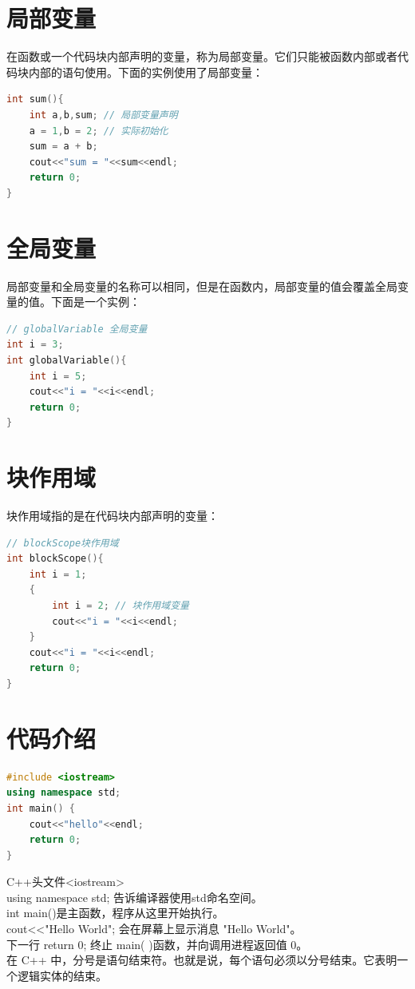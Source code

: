 \documentclass[12pt,twiside,a4paper]{ctexbook}
\numberwithin{chapter}{part}
\begin{document}
\section{局部变量}
在函数或一个代码块内部声明的变量，称为局部变量。它们只能被函数内部或者代码块内部的语句使用。下面的实例使用了局部变量：
\begin{lstlisting}[language=C++]
int sum(){
	int a,b,sum; // 局部变量声明
	a = 1,b = 2; // 实际初始化
	sum = a + b;
	cout<<"sum = "<<sum<<endl;
	return 0;
}
\end{lstlisting}

\section{全局变量}
局部变量和全局变量的名称可以相同，但是在函数内，局部变量的值会覆盖全局变量的值。下面是一个实例：
\begin{lstlisting}[language=C++]
// globalVariable 全局变量
int i = 3;
int globalVariable(){
	int i = 5;
	cout<<"i = "<<i<<endl;
	return 0;
}
\end{lstlisting}

\section{块作用域}
块作用域指的是在代码块内部声明的变量：
\begin{lstlisting}[language=C++]
// blockScope块作用域
int blockScope(){
	int i = 1;
	{
		int i = 2; // 块作用域变量
		cout<<"i = "<<i<<endl;
	}
	cout<<"i = "<<i<<endl;
	return 0;
}
\end{lstlisting}
\section{代码介绍}
\begin{lstlisting}[language=C++]
#include <iostream>
using namespace std;
int main() {
	cout<<"hello"<<endl;
	return 0;
}
\end{lstlisting}
C++头文件<iostream>\\
using namespace std; 告诉编译器使用std命名空间。\\
int main()是主函数，程序从这里开始执行。\\
cout<<"Hello World"; 会在屏幕上显示消息 "Hello World"。\\
下一行 return 0; 终止 main( )函数，并向调用进程返回值 0。\\
在 C++ 中，分号是语句结束符。也就是说，每个语句必须以分号结束。它表明一个逻辑实体的结束。
\end{document}

